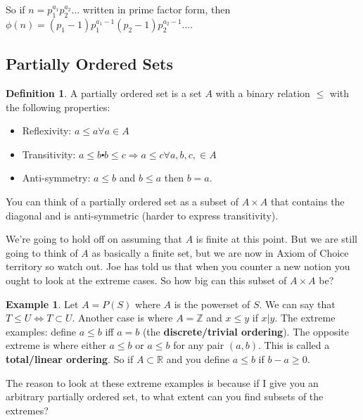\documentclass[12pt]{article}
\theoremstyle{definition}
\newtheorem{defn}{Definition}
\newtheorem{exmp}{Example}[section]
\begin{document}
So if $n = p_1^{a_1}p_2^{a_2}\ldots$ written in prime factor form, then
$\phi(n) = (p_1 - 1)p_1^{a_1 - 1}(p_2 - 1)p_2^{a_2 - 1} \ldots$. 

\subsection{Partially Ordered Sets}

\begin{defn}
    A partially ordered set is a set $A$ with a binary relation $\le$ with the following properties:
    \begin{itemize}
        \item Reflexivity: $a \le a \forall a \in A$
        \item
            Transitivity: $a \le b \centerdot b \le c \Rightarrow a \le c
            \forall a, b, c, \in A$
        \item Anti-symmetry: $a \le b$ and $b \le a$ then $b = a$.
    \end{itemize}
    You can think of a partially ordered set as a subset of $A \times A$ that
    contains the diagonal and is anti-symmetric (harder to express transitivity). 
\end{defn}

We're going to hold off on assuming that $A$ is finite at this point. But we
are still going to think of $A$ as basically a finite set, but we are now in
Axiom of Choice territory so watch out. Joe has told us that when you counter a
new notion you ought to look at the extreme cases. So how big can this subset
of $A \times A$ be? 

\begin{exmp}
    Let $A = P(S)$ where $A$ is the powerset of $S$. We can say that $T \le U
    \Leftrightarrow T \subset U$. Another case is where $A = \mathbb{Z}$ and $x
    \le y$ if $x | y$. The extreme examples: define $a \le b$ iff $a = b$ (the
    \textbf{discrete/trivial ordering}). The opposite extreme is where either
    $a \le b$ or $a \le b$ for any pair $(a, b)$. This is called a
    \textbf{total/linear ordering}.  So if $A \subset \mathbb{R}$ and you
    define $a \le b$ if $b - a \ge 0$.
\end{exmp}

The reason to look at these extreme examples is because if I give you an
arbitrary partially ordered set, to what extent can you find subsets of the
extremes?
\end{document}
